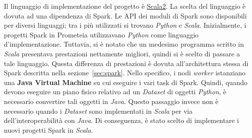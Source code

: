 Il linguaggio di implementazione del progetto è \href{https://www.scala-lang.org/}{Scala2}.
La scelta del linguaggio è dovuta ad una dipendenza di Spark.
Le API dei moduli di Spark sono disponibili per diversi linguaggi;
tra i più utilizzati si trovano \textit{Python} e \textit{Scala}.
Inizialmente, i progetti Spark in Prometeia utilizzavano \textit{Python} come linguaggio d'implementazione.
Tuttavia, si è notato che un medesimo programma scritto in \textit{Scala} presentava prestazioni nettamente migliori, quindi si è scelto di passare a tale linguaggio.
Questa differenza di prestazioni è dovuta all'architettura stessa di Spark descritta nella sezione~\ref{sec:spark}.
Nello specifico, i nodi \textit{worker} istanziano una \textbf{Java Virtual Machine} su cui eseguire i vari task di Spark.
Quindi, quando devono eseguire un piano fisico relativo ad un \textit{Dataset} di oggetti \textit{Python}, è necessario convertire tali oggetti in \textit{Java}.
Questo passaggio invece non è necessario quando i \textit{Dataset} sono implementati in \textit{Scala} per via dell'interoperabilità con \textit{Java}.
Di conseguenza, è stato scelto di implementare i nuovi progetti Spark in \textit{Scala}.

